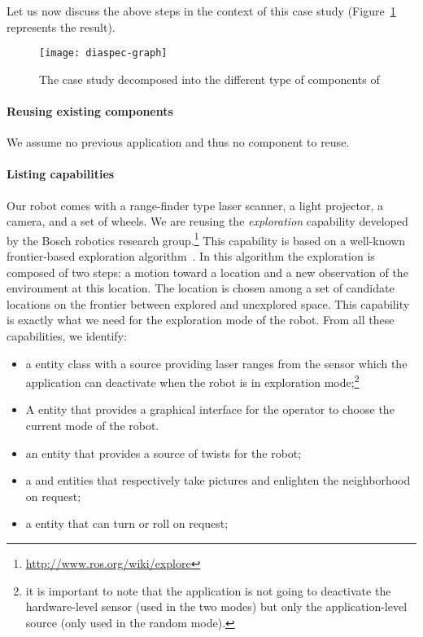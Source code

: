 Let us now discuss the above steps in the context of this case
study (Figure~\ref{fig:diaspec-graph} represents the result).

\begin{figure}
  \centering
  \texttt{[image: diaspec-graph]}
  \caption{The case study decomposed into the different type of
    components of \diaspec{}}
\label{fig:diaspec-graph}
\end{figure}

\paragraph*{Reusing existing components}
We assume no previous \diaspec{} application and thus no \diaspec{}
component to reuse.

\paragraph*{Listing capabilities}
Our robot comes with a range-finder type laser scanner, a light
projector, a camera, and a set of wheels. We are reusing the
\emph{exploration} capability developed by the Bosch robotics research
group.\footnote{\url{http://www.ros.org/wiki/explore}} This capability
is based on a well-known frontier-based exploration
algorithm~\cite{Yamau98a}. In this algorithm the exploration is
composed of two steps: a motion toward a location and a new
observation of the environment at this location. The location is
chosen among a set of candidate locations on the frontier between
explored and unexplored space. This capability is exactly what we need
for the exploration mode of the robot. From all these capabilities, we
identify:
\begin{itemize}
\item a  entity class with a  source
  providing laser ranges from the sensor which the application can
  deactivate when the robot is in exploration mode;\footnote{it is
    important to note that the application is not going to deactivate
    the hardware-level sensor (used in the two modes) but only the
    application-level source (only used in the random mode).}
\item A  entity that provides a graphical interface
  for the operator to choose the current mode of the robot.
\item an  entity that provides a source of twists for
  the robot;
\item a  and  entities that respectively take
  pictures and enlighten the neighborhood on request;
\item a  entity that can turn or roll on request;
\end{itemize}

